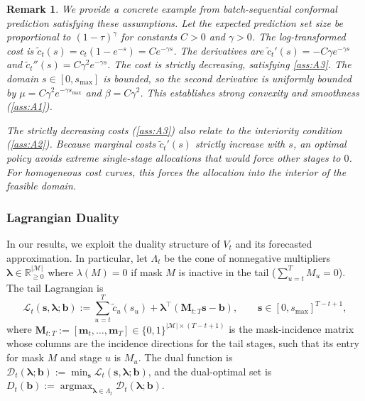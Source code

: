 \documentclass{uai2026} %
\newtheorem*{remark}{Remark}
\newcommand{\R}{\mathbb{R}}
\newcommand{\1}{\mathbf{1}}
\newcommand{\mcal}{\mathcal{M}}
\newcommand{\argmax}{\operatorname*{argmax}}
\begin{document}
\begin{remark}
  We provide a concrete example from batch-sequential conformal prediction satisfying these assumptions.
  Let the expected prediction set size be proportional to $(1-\tau)^{\gamma}$ for constants $C > 0$ and $\gamma > 0$.
  The log-transformed cost is $\tilde{c}_{t}(s) = c_t(1-e^{-s}) = C e^{-\gamma s}$.
  The derivatives are $\tilde{c}_{t}'(s) = -C\gamma e^{-\gamma s}$ and $\tilde{c}_{t}''(s) = C\gamma^2 e^{-\gamma s}$.
  The cost is strictly decreasing, satisfying \ref{ass:A3}.
  The domain $s \in [0, s_{\max}]$ is bounded, so the second derivative is uniformly bounded by $\mu = C\gamma^2 e^{-\gamma s_{\max}}$ and $\beta = C\gamma^2$.
  This establishes strong convexity and smoothness (\ref{ass:A1}).

  The strictly decreasing costs (\ref{ass:A3}) also relate to the interiority condition (\ref{ass:A2}).
  Because marginal costs $\tilde{c}_{t}'(s)$ strictly increase with $s$, an optimal policy avoids extreme single-stage allocations that would force other stages to $0$.
  For homogeneous cost curves, this forces the allocation into the interior of the feasible domain.
\end{remark}

\subsubsection{Lagrangian Duality}
\label{subsec:duality}

In our results, we exploit the duality structure of $V_t$ and its forecasted approximation. In particular, let $\Lambda_t$ be the cone of nonnegative multipliers $\boldsymbol{\lambda} \in \R_{\ge 0}^{|\mcal|}$ where $\lambda(M)=0$ if mask $M$ is inactive in the tail ($\sum_{u=t}^T M_u = 0$).
The tail Lagrangian is
\begin{equation*}
  \mathcal{L}_t(\mathbf{s},\boldsymbol{\lambda};\mathbf{b})
  :=
  \sum_{u=t}^{T} \tilde{c}_u(s_u)
  + \boldsymbol{\lambda}^\top (\mathbf{M}_{t:T} \mathbf{s} - \mathbf{b}),
  \qquad \mathbf{s} \in [0,s_{\max}]^{T-t+1},
\end{equation*}
where $\mathbf{M}_{t:T} := [\mathbf{m}_t, \dots, \mathbf{m}_T] \in \{0,1\}^{|\mcal| \times (T-t+1)}$ is the mask-incidence matrix whose columns are the incidence directions for the tail stages, such that its entry for mask $M$ and stage $u$ is $M_u$.
The dual function is $\mathcal{D}_t(\boldsymbol{\lambda};\mathbf{b}) := \min_{\mathbf{s}} \mathcal{L}_t(\mathbf{s},\boldsymbol{\lambda};\mathbf{b})$, and the dual-optimal set is $D_t(\mathbf{b}) := \argmax_{\boldsymbol{\lambda} \in \Lambda_t} \mathcal{D}_t(\boldsymbol{\lambda};\mathbf{b})$.
\end{document}
